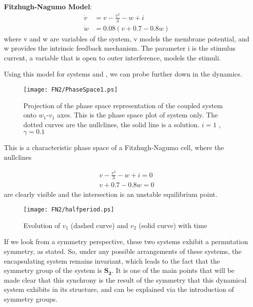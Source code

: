 \begin{model}
\textbf{Fitzhugh-Nagumo Model}:
\begin{align}
\dot{v}&=v-\frac{v^3}{3}-w+i\\
\dot{w}&=0.08(v+0.7-0.8 w )
\end{align}
%
where v and w are variables of the system, v models the membrane potential, and w provides the intrinsic feedback mechanism. The parameter i is the stimulus current, a variable that is open to outer interference, models the stimuli. 
\end{model}

Using this model for systems   and , we can probe further down in the dynamics. 
\begin{figure}[H]
\center
\texttt{[image: FN2/PhaseSpace1.ps]}
\caption[Projection of the phase space representation of the coupled system onto $w_1$-$v_1$ axes.]{Projection of the phase space representation of the coupled system onto $w_1$-$v_1$ axes. This is the phase space plot of system  only. The dotted  curves are the nullclines, the solid line is a solution. $i=1$ , $\gamma  = 0.1$}
\end{figure}

This is a characteristic phase space of a Fitzhugh-Nagumo cell, where the nullclines

\begin{align}
v-\frac{v^3}{3}-w+i=0\\
v+0.7-0.8 w = 0
\end{align}
%
are clearly visible and the intersection is an unstable equilibrium point. 

\begin{figure}[H]
\center
\texttt{[image: FN2/halfperiod.ps]}
\caption{Evolution of $v_1$ (dashed curve) and $v_2$ (solid curve) with time}
\end{figure}

If we look from a symmetry perspective, these two systems exhibit a permutation symmetry, as stated. So, under any possible arrangements of these systems, the encapsulating system remains invariant, which leads to the fact that the symmetry group of the system is $\mathbf{S_2}$. It is one of the main points that will be made clear that this synchrony is the result of the symmetry that this dynamical system exhibits in its structure, and can be explained via the introduction of symmetry groups. 

